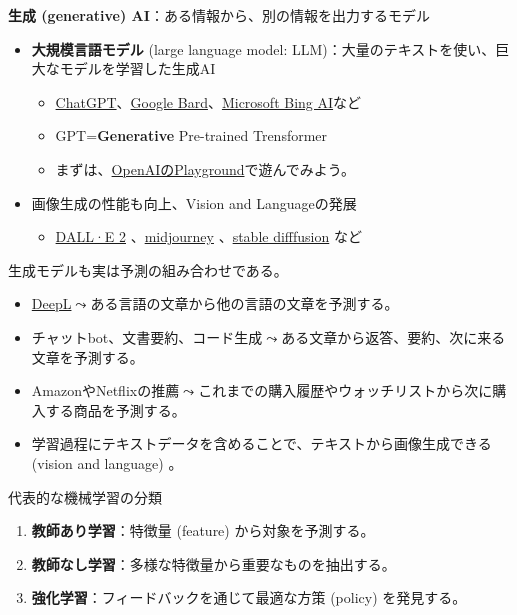 \documentclass[
  xelatex,
  ja=standard]{bxjsarticle}
\providecommand{\tightlist}{%
  \setlength{\itemsep}{0pt}\setlength{\parskip}{0pt}}\usepackage{longtable,booktabs,array}
\begin{document}
\textbf{生成 (generative) AI}：ある情報から、別の情報を出力するモデル

\begin{itemize}
\tightlist
\item
  \textbf{大規模言語モデル} (large language model:
  LLM)：大量のテキストを使い、巨大なモデルを学習した生成AI

  \begin{itemize}
  \tightlist
  \item
    \href{https://openai.com/blog/chatgpt}{ChatGPT}、\href{https://bard.google.com/}{Google
    Bard}、\href{https://www.microsoft.com/ja-jp/bing?form=MA13FJ}{Microsoft
    Bing AI}など
  \item
    GPT=\textbf{Generative} Pre-trained Trensformer
  \item
    まずは、\href{https://platform.openai.com/examples}{OpenAIのPlayground}で遊んでみよう。
  \end{itemize}
\item
  画像生成の性能も向上、Vision and Languageの発展

  \begin{itemize}
  \tightlist
  \item
    \href{https://openai.com/dall-e-2/}{DALL·E 2}
    、\href{https://www.midjourney.com/}{midjourney}
    、\href{https://huggingface.co/spaces/stabilityai/stable-diffusion}{stable
    difffusion} など
  \end{itemize}
\end{itemize}

生成モデルも実は予測の組み合わせである。

\begin{itemize}
\tightlist
\item
  \href{https://www.deepl.com/translator}{DeepL}\(\leadsto\)ある言語の文章から他の言語の文章を予測する。
\item
  チャットbot、文書要約、コード生成\(\leadsto\)ある文章から返答、要約、次に来る文章を予測する。
\item
  AmazonやNetflixの推薦\(\leadsto\)これまでの購入履歴やウォッチリストから次に購入する商品を予測する。
\item
  学習過程にテキストデータを含めることで、テキストから画像生成できる
  (vision and language) 。
\end{itemize}

代表的な機械学習の分類

\begin{enumerate}
\def\labelenumi{\arabic{enumi}.}
\tightlist
\item
  \textbf{教師あり学習}：特徴量 (feature) から対象を予測する。
\item
  \textbf{教師なし学習}：多様な特徴量から重要なものを抽出する。
\item
  \textbf{強化学習}：フィードバックを通じて最適な方策 (policy)
  を発見する。
\end{enumerate}
\end{document}
